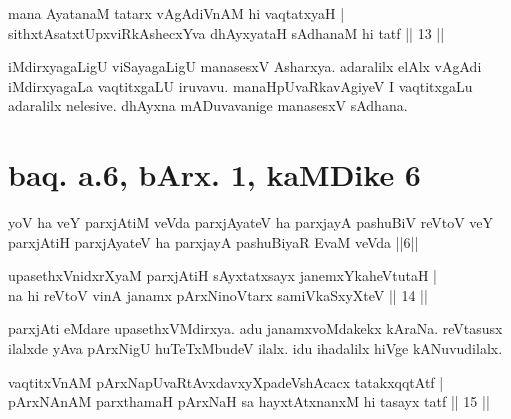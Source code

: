
\begin{shl}
mana AyatanaM tatarx vAgAdiVnAM hi vaqtatxyaH | \\
sithxtAsatxtUpxviRkAshecxYva dhAyxyataH sAdhanaM hi tatf \hfill|| 13 || 
\end{shl}

\begin{artha} 
iMdirxyagaLigU viSayagaLigU manasesxV Asharxya. adaralilx elAlx vAgAdi 
iMdirxyagaLa vaqtitxgaLU iruvavu. manaHpUvaRkavAgiyeV I vaqtitxgaLu 
adaralilx nelesive. dhAyxna mADuvavanige manasesxV sAdhana.
\end{artha}

\section*{baq. a.6, bArx. 1, kaMDike 6}

\begin{shl}
\footnotemark[2]yoV ha veY parxjAtiM veVda parxjAyateV ha parxjayA pashuBiV reVtoV veY parxjAtiH parxjAyateV ha parxjayA pashuBiyaR EvaM veVda ||6||
\end{shl}


\begin{shl}
upasethxVnidxrXyaM parxjAtiH sAyxtatxsayx janemxYkaheVtutaH | \\
na hi reVtoV vinA janamx pArxNinoV\s tarx samiVkaSxyXteV \hfill|| 14 || 
\end{shl}

\begin{artha} 
parxjAti eMdare upasethxVMdirxya. adu janamxvoMdakekx kAraNa. reVtasusx ilalxde yAva pArxNigU huTeTxMbudeV ilalx. idu ihadalilx hiVge kANuvudilalx.
\end{artha}


\begin{shl}
vaqtitxVnAM pArxNapUvaRtAvxdavxyXpadeVshAcacx tatakxqqtAtf | \\
pArxNAnAM parxthamaH pArxNaH sa hayxtAtx\s nanxM hi tasayx tatf \hfill|| 15 || 
\end{shl}


